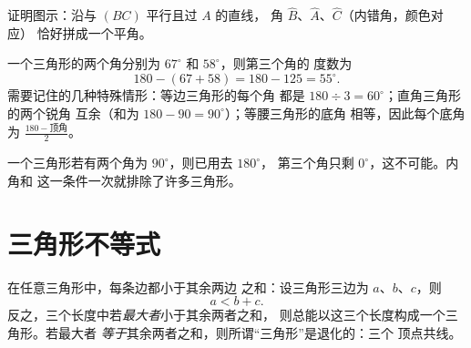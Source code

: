 \begin{omfigure}

{\small 证明图示：沿与 $(BC)$ 平行且过 $A$ 的直线，
角 $\widehat B$、$\widehat A$、$\widehat C$（内错角，颜色对应）
恰好拼成一个平角。}
\end{omfigure}

\begin{example}\label{ex:g7:triangles:sum}
一个三角形的两个角分别为 $67^\circ$ 和 $58^\circ$，则第三个角的
度数为
\[
180 - (67 + 58) = 180 - 125 = 55^\circ .
\]
需要记住的几种特殊情形：等边三角形的每个角
都是 $180 \div 3 = 60^\circ$；直角三角形的两个锐角
互余（和为 $180 - 90 = 90^\circ$）；等腰三角形的底角
相等，因此每个底角
为 $\frac{180 - \text{顶角}}{2}$。
\end{example}

\begin{example}[两个角为直角的三角形不存在]\label{ex:g7:triangles:tworight}
一个三角形若有两个角为 $90^\circ$，则已用去 $180^\circ$，
第三个角只剩 $0^\circ$，这不可能。内角和
这一条件一次就排除了许多三角形。
\end{example}

\section{三角形不等式}

\begin{theorem}[三角形不等式]\label{thm:g7:triangles:inequality}
在任意三角形中，每条边都小于其余两边
之和：设三角形三边为 $a$、$b$、$c$，则
\[
a < b + c .
\]
反之，三个长度中若\emph{最大者}小于其余两者之和，
则总能以这三个长度构成一个三角形。若最大者
\emph{等于}其余两者之和，则所谓“三角形”是退化的：三个
顶点共线。
\end{theorem}
\admitted

